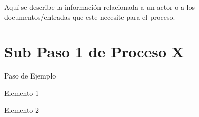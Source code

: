 Aquí se describe la información relacionada a un actor o a los documentos/entradas que este necesite para el proceso.
\chapter{Sub Paso 1 de Proceso X}
\begin{UMStep}{Paso de Ejemplo}
	\item Elemento 1
	\item Elemento 2
\end{UMStep}
